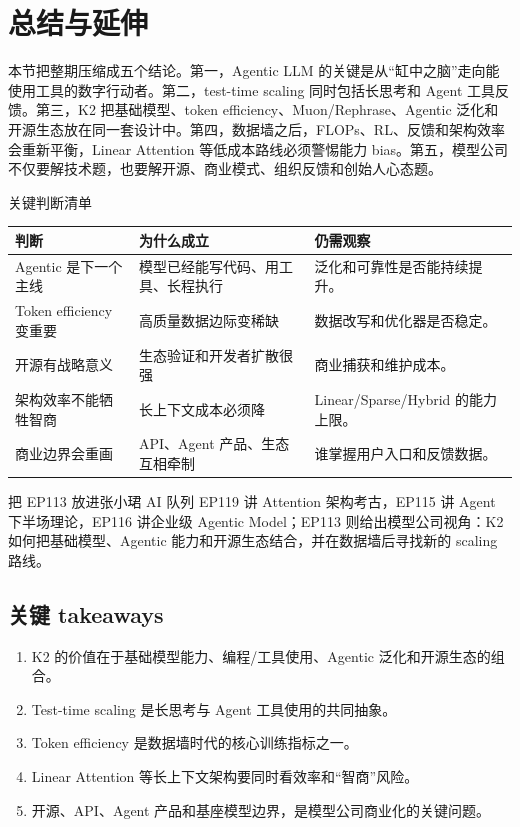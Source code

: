 \section{总结与延伸}

本节把整期压缩成五个结论。第一，Agentic LLM 的关键是从“缸中之脑”走向能使用工具的数字行动者。第二，test-time scaling 同时包括长思考和 Agent 工具反馈。第三，K2 把基础模型、token efficiency、Muon/Rephrase、Agentic 泛化和开源生态放在同一套设计中。第四，数据墙之后，FLOPs、RL、反馈和架构效率会重新平衡，Linear Attention 等低成本路线必须警惕能力 bias。第五，模型公司不仅要解技术题，也要解开源、商业模式、组织反馈和创始人心态题。

\begin{knowledgebox}{关键判断清单}
\begin{tabularx}{\textwidth}{p{}p{}X}
\toprule
判断 & 为什么成立 & 仍需观察 \\
\midrule
Agentic 是下一个主线 & 模型已经能写代码、用工具、长程执行 & 泛化和可靠性是否能持续提升。 \\
Token efficiency 变重要 & 高质量数据边际变稀缺 & 数据改写和优化器是否稳定。 \\
开源有战略意义 & 生态验证和开发者扩散很强 & 商业捕获和维护成本。 \\
架构效率不能牺牲智商 & 长上下文成本必须降 & Linear/Sparse/Hybrid 的能力上限。 \\
商业边界会重画 & API、Agent 产品、生态互相牵制 & 谁掌握用户入口和反馈数据。 \\
\bottomrule
\end{tabularx}
\end{knowledgebox}

\begin{importantbox}{把 EP113 放进张小珺 AI 队列}
EP119 讲 Attention 架构考古，EP115 讲 Agent 下半场理论，EP116 讲企业级 Agentic Model；EP113 则给出模型公司视角：K2 如何把基础模型、Agentic 能力和开源生态结合，并在数据墙后寻找新的 scaling 路线。
\end{importantbox}

\subsection{关键 takeaways}

\begin{enumerate}
\item K2 的价值在于基础模型能力、编程/工具使用、Agentic 泛化和开源生态的组合。
\item Test-time scaling 是长思考与 Agent 工具使用的共同抽象。
\item Token efficiency 是数据墙时代的核心训练指标之一。
\item Linear Attention 等长上下文架构要同时看效率和“智商”风险。
\item 开源、API、Agent 产品和基座模型边界，是模型公司商业化的关键问题。
\end{enumerate}

